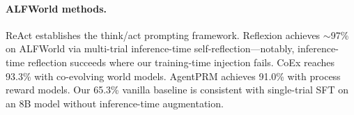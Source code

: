 \paragraph{ALFWorld methods.}
ReAct \cite{yao2023react} establishes the think/act prompting framework. Reflexion \cite{shinn2023reflexion} achieves $\sim$97\% on ALFWorld via multi-trial inference-time self-reflection---notably, inference-time reflection succeeds where our training-time injection fails. CoEx \cite{kim2025coex} reaches 93.3\% with co-evolving world models. AgentPRM \cite{agentprm2025} achieves 91.0\% with process reward models. Our 65.3\% vanilla baseline is consistent with single-trial SFT on an 8B model without inference-time augmentation.
